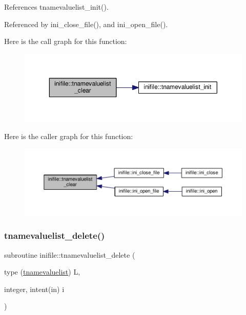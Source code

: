References tnamevaluelist\+\_\+init().



Referenced by ini\+\_\+close\+\_\+file(), and ini\+\_\+open\+\_\+file().

Here is the call graph for this function\+:
\nopagebreak
\begin{figure}[H]
\begin{center}
\leavevmode
\includegraphics[width=350pt]{namespaceinifile_a06106a843a985f0a3a97ecff6fb2b339_cgraph}
\end{center}
\end{figure}
Here is the caller graph for this function\+:
\nopagebreak
\begin{figure}[H]
\begin{center}
\leavevmode
\includegraphics[width=350pt]{namespaceinifile_a06106a843a985f0a3a97ecff6fb2b339_icgraph}
\end{center}
\end{figure}
\mbox{\label{namespaceinifile_afbd40722f8a5cfa2f23ed35ed7645466}} 
\subsubsection{\texorpdfstring{tnamevaluelist\+\_\+delete()}{tnamevaluelist\_delete()}}
{\footnotesize\ttfamily subroutine inifile\+::tnamevaluelist\+\_\+delete (\begin{DoxyParamCaption}\item[{type (\mbox{\hyperlink{structinifile_1_1tnamevaluelist}{tnamevaluelist}})}]{L,  }\item[{integer, intent(in)}]{i }\end{DoxyParamCaption})}

